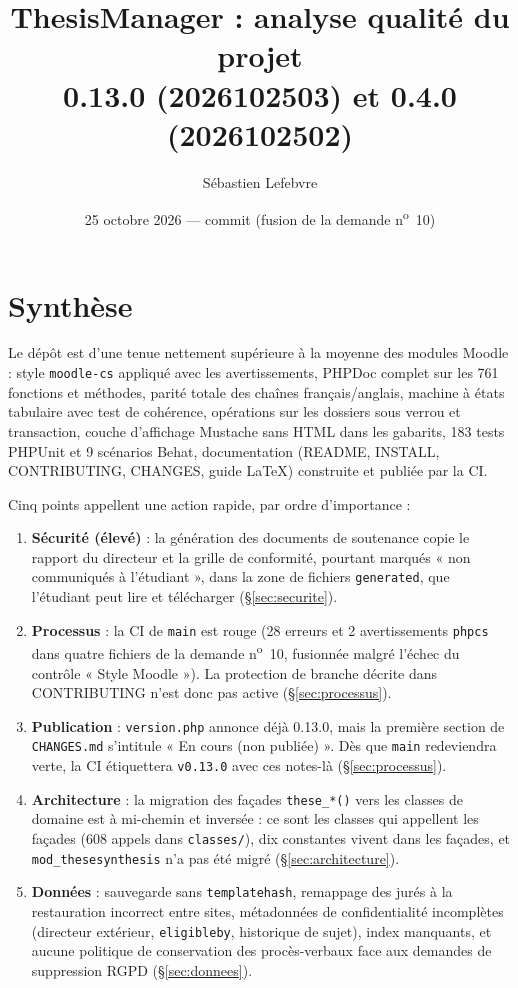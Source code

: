 \documentclass[11pt,a4paper]{article}
\title{ThesisManager : analyse qualité du projet\\
  \large \code{mod\_these} 0.13.0 (2026102503) et \code{mod\_thesesynthesis} 0.4.0 (2026102502)}
\author{Sébastien Lefebvre}
\date{25 octobre 2026 --- commit \code{766613e} (fusion de la demande n\textsuperscript{o}~10)}
\newcommand{\fichier}[1]{\texttt{\small #1}}
\newcommand{\code}[1]{\texttt{#1}}
\newcommand{\sev}[1]{\textbf{#1}}
\begin{document}
\maketitle

\section*{Synthèse}

Le dépôt est d'une tenue nettement supérieure à la moyenne des modules Moodle : style
\code{moodle-cs} appliqué avec les avertissements, PHPDoc complet sur les 761 fonctions et
méthodes, parité totale des chaînes français/anglais, machine à états tabulaire avec test de
cohérence, opérations sur les dossiers sous verrou et transaction, couche d'affichage Mustache
sans HTML dans les gabarits, 183 tests PHPUnit et 9 scénarios Behat, documentation (README,
INSTALL, CONTRIBUTING, CHANGES, guide LaTeX) construite et publiée par la CI.

Cinq points appellent une action rapide, par ordre d'importance :

\begin{enumerate}
  \item \sev{Sécurité (élevé)} : la génération des documents de soutenance copie le rapport
    du directeur et la grille de conformité, pourtant marqués « non communiqués à l'étudiant »,
    dans la zone de fichiers \code{generated}, que l'étudiant peut lire et télécharger
    (§\ref{sec:securite}).
  \item \sev{Processus} : la CI de \code{main} est rouge (28 erreurs et 2 avertissements
    \code{phpcs} dans quatre fichiers de la demande n\textsuperscript{o}~10, fusionnée malgré
    l'échec du contrôle « Style Moodle »). La protection de branche décrite dans CONTRIBUTING
    n'est donc pas active (§\ref{sec:processus}).
  \item \sev{Publication} : \code{version.php} annonce déjà 0.13.0, mais la première section
    de \fichier{CHANGES.md} s'intitule « En cours (non publiée) ». Dès que \code{main} redeviendra
    verte, la CI étiquettera \code{v0.13.0} avec ces notes-là (§\ref{sec:processus}).
  \item \sev{Architecture} : la migration des façades \code{these\_*()} vers les classes de
    domaine est à mi-chemin et inversée : ce sont les classes qui appellent les façades
    (608 appels dans \fichier{classes/}), dix constantes vivent dans les façades, et
    \code{mod\_thesesynthesis} n'a pas été migré (§\ref{sec:architecture}).
  \item \sev{Données} : sauvegarde sans \code{templatehash}, remappage des jurés à la
    restauration incorrect entre sites, métadonnées de confidentialité incomplètes (directeur
    extérieur, \code{eligibleby}, historique de sujet), index manquants, et aucune politique de
    conservation des procès-verbaux face aux demandes de suppression RGPD (§\ref{sec:donnees}).
\end{enumerate}
\end{document}
